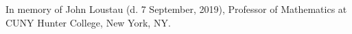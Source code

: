 
In memory of John Loustau (d. 7 September, 2019), Professor of Mathematics at CUNY Hunter College, New York, NY.
